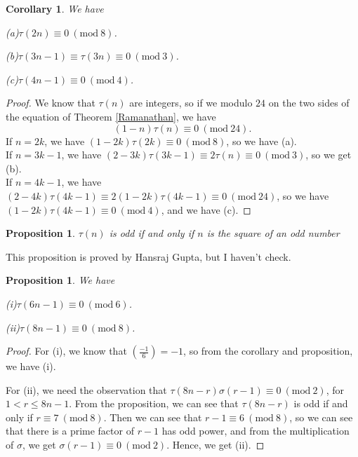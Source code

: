 \documentclass{article}
\newtheorem{corollary}[theorem]{Corollary}
\newtheorem{proposition}[theorem]{Proposition}
\newcommand{\Mod}[1]{\ (\mathrm{mod}\ #1)}
\begin{document}
\begin{corollary}
    We have 

    (a)$\tau(2n)\equiv 0\Mod{8}$.

    (b)$\tau(3n-1)\equiv \tau(3n) \equiv 0 \Mod{3}$.

    (c)$\tau(4n-1)\equiv 0 \Mod{4}$.
\end{corollary}
\begin{proof}
    We know that $\tau(n)$ are integers, so if we modulo $24$ on the two sides of the equation of Theorem \ref{Ramanathan}, we have 
    \[(1-n)\tau(n)\equiv 0\Mod{24}.\]
    If $n=2k$, we have $(1-2k)\tau(2k)\equiv 0\Mod{8}$, so we have (a).\\
    If $n=3k-1$, we have $(2-3k)\tau(3k-1)\equiv 2\tau(n) \equiv 0\Mod{3}$, so we get (b).\\
    If $n=4k-1$, we have $(2-4k)\tau(4k-1)\equiv 2(1-2k)\tau(4k-1) \equiv 0\Mod{24}$, so we have $(1-2k)\tau(4k-1)\equiv 0 \Mod{4}$, and we have (c).
\end{proof}

\begin{proposition}
    $\tau(n)$ is odd if and only if $n$ is the square of an odd number
\end{proposition}
This proposition is proved by Hansraj Gupta, but I haven't check.
\begin{proposition}
    We have 

    (i)$\tau(6n-1)\equiv 0 \Mod{6}$.
    
    (ii)$\tau(8n-1)\equiv 0 \Mod{8}$.
\end{proposition}
\begin{proof}
    For (i), we know that $\left(\frac{-1}{6}\right)=-1$, so from the corollary and proposition, we have (i).

    For (ii), we need the observation that $\tau(8n-r)\sigma(r-1)\equiv 0\Mod{2}$, for $1<r\leq 8n-1$. From the proposition, we can see that $\tau(8n-r)$ is odd if and only if $r\equiv 7\Mod{8}$. Then we can see that $r-1\equiv 6 \Mod{8}$, so we can see that there is a prime factor of $r-1$ has odd power, and from the multiplication of $\sigma$, we get $\sigma(r-1)\equiv 0 \Mod{2}$. Hence, we get (ii).
\end{proof}





% 

\end{document}

